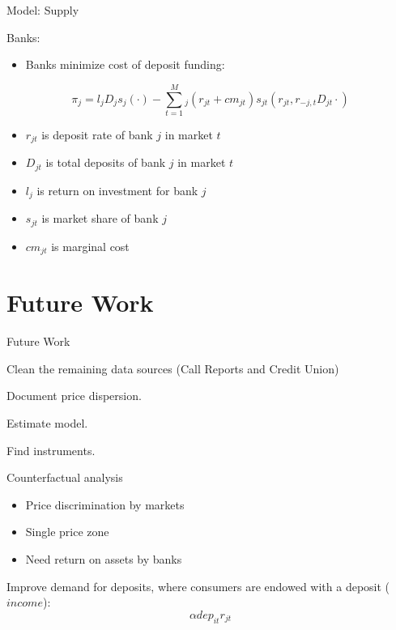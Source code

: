 \documentclass[notes,11pt, aspectratio=169]{beamer}
\newenvironment{wideitemize}{\itemize\addtolength{\itemsep}{10pt}}{\enditemize}
\begin{document}
\begin{frame}{Model: Supply}
  
Banks:

\begin{itemize}
  \item Banks minimize cost of deposit funding:

\end{itemize}

\begin{equation}
  \label{eq:empirical-prev3}
  \pi_{j} =  l_j D_j s_j(\cdot) - \sum_{t=1}^M_j (r_{jt} + cm_{jt})s_{jt}(r_{jt}, r_{-j,t}D_{jt}\cdot) 
\end{equation}


\begin{itemize}
  \item $r_{jt}$ is deposit rate of bank $j$ in market $t$
  \item $D_{jt}$ is total deposits of bank $j$ in market $t$
  \item $l_j$ is return on investment for bank $j$
  \item $s_{jt}$ is market share of bank $j$
  \item $cm_{jt}$ is marginal cost

\end{itemize}

\end{frame}


\section{Future Work}

\begin{frame}{Future Work}
        \begin{wideitemize}
        \item Clean the remaining data sources (Call Reports and Credit Union)

        \item Document price dispersion.
        
        \item Estimate model.
        
        \item Find instruments.
        
        \item Counterfactual analysis
         \begin{itemize}
          \item Price discrimination by markets
          \item Single price zone 
          \item Need return on assets by banks
        \end{itemize}

        \item Improve demand for deposits, where consumers are endowed with a deposit ($income$):
        $$\alpha dep_{it} r_{jt}$$

        \end{wideitemize}
    
\end{frame}
\end{document}

